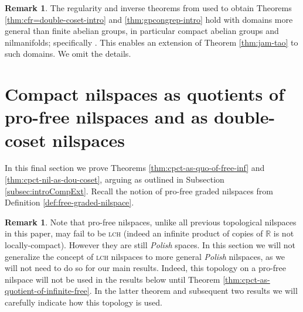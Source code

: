 \documentclass[a4paper,12pt,reqno]{amsart}
\theoremstyle{definition}
\newtheorem{remark}[theorem]{Remark}
\newcommand{\mb}{\mathbb}
\begin{document}
\begin{remark}\label{rem:invthmextension}
The regularity and inverse theorems from \cite{CSinverse} used to obtain Theorems \ref{thm:cfr=double-coset-intro} and \ref{thm:gpcongrep-intro} hold with domains more general than finite abelian groups, in particular compact abelian groups and nilmanifolds; specifically \cite[Theorem 1.5 and Theorem 5.2]{CSinverse}. This enables an extension of Theorem \ref{thm:jam-tao} to such domains. We omit the details.
\end{remark}

\section{Compact nilspaces as quotients of pro-free nilspaces and as double-coset nilspaces}\label{sec:cpct-nil}
\noindent In this final section we prove Theorems  \ref{thm:cpct-as-quo-of-free-inf} and \ref{thm:cpct-nil-as-dou-coset}, arguing as outlined in Subsection \ref{subsec:introCompExt}. Recall the notion of pro-free graded nilspaces from Definition \ref{def:free-graded-nilspace}.

\begin{remark}\label{rem:not-gen-theory}
Note that pro-free nilspaces, unlike all previous topological nilspaces in this paper, may fail to be \textsc{lch} (indeed an infinite product of copies of $\mb{R}$ is not locally-compact). However they are still \emph{Polish} spaces. In this section we will not generalize the concept of \textsc{lch} nilspaces to more general \emph{Polish} nilspaces, as we will not need to do so for our main results. Indeed, this topology on a pro-free nilspace will not be used in the results below until Theorem \ref{thm:cpct-as-quotient-of-infinite-free}. In the latter theorem and subsequent two results we will carefully indicate how this topology is used.
\end{remark}
\end{document}
